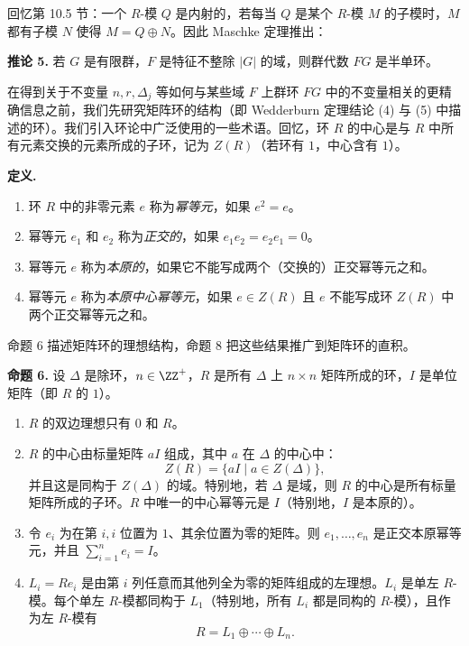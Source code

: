 回忆第 10.5 节：一个 $R$-模 $Q$ 是内射的，若每当 $Q$ 是某个 $R$-模 $M$ 的子模时，$M$ 都有子模 $N$ 使得 $M=Q\oplus N$。因此 Maschke 定理推出：

\medskip
\noindent\textbf{推论 5.} 若 $G$ 是有限群，$F$ 是特征不整除 $|G|$ 的域，则群代数 $FG$ 是半单环。

在得到关于不变量 $n,r,\Delta_j$ 等如何与某些域 $F$ 上群环 $FG$ 中的不变量相关的更精确信息之前，我们先研究矩阵环的结构（即 Wedderburn 定理结论 (4) 与 (5) 中描述的环）。我们引入环论中广泛使用的一些术语。回忆，环 $R$ 的中心是与 $R$ 中所有元素交换的元素所成的子环，记为 $Z(R)$（若环有 $1$，中心含有 $1$）。

\noindent\textbf{定义.}
\begin{enumerate}[label=(\arabic*)]
  \item 环 $R$ 中的非零元素 $e$ 称为\emph{幂等元}，如果 $e^2=e$。
  \item 幂等元 $e_1$ 和 $e_2$ 称为\emph{正交的}，如果 $e_1e_2=e_2e_1=0$。
  \item 幂等元 $e$ 称为\emph{本原的}，如果它不能写成两个（交换的）正交幂等元之和。
  \item 幂等元 $e$ 称为\emph{本原中心幂等元}，如果 $e\in Z(R)$ 且 $e$ 不能写成环 $Z(R)$ 中两个正交幂等元之和。
\end{enumerate}

命题 6 描述矩阵环的理想结构，命题 8 把这些结果推广到矩阵环的直积。

\medskip
\noindent\textbf{命题 6.} 设 $\Delta$ 是除环，$n\in\ZZ^+$，$R$ 是所有 $\Delta$ 上 $n\times n$ 矩阵所成的环，$I$ 是单位矩阵（即 $R$ 的 $1$）。
\begin{enumerate}[label=(\arabic*)]
  \item $R$ 的双边理想只有 $0$ 和 $R$。
  \item $R$ 的中心由标量矩阵 $aI$ 组成，其中 $a$ 在 $\Delta$ 的中心中：
  \[
    Z(R)=\{aI\mid a\in Z(\Delta)\},
  \]
  并且这是同构于 $Z(\Delta)$ 的域。特别地，若 $\Delta$ 是域，则 $R$ 的中心是所有标量矩阵所成的子环。$R$ 中唯一的中心幂等元是 $I$（特别地，$I$ 是本原的）。
  \item 令 $e_i$ 为在第 $i,i$ 位置为 $1$、其余位置为零的矩阵。则 $e_1,
  \ldots,e_n$ 是正交本原幂等元，并且 $\sum_{i=1}^n e_i=I$。
  \item $L_i=Re_i$ 是由第 $i$ 列任意而其他列全为零的矩阵组成的左理想。$L_i$ 是单左 $R$-模。每个单左 $R$-模都同构于 $L_1$（特别地，所有 $L_i$ 都是同构的 $R$-模），且作为左 $R$-模有
  \[
    R=L_1\oplus\cdots\oplus L_n.
  \]
\end{enumerate}

